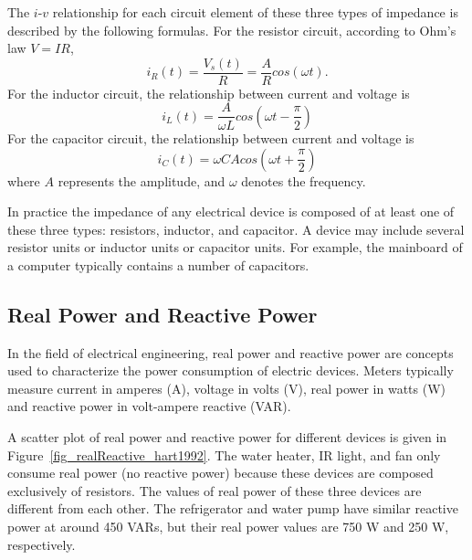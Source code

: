 The $i$-$v$ relationship for each circuit element of these
three types of impedance is described by the following formulas.
For the resistor circuit, according to Ohm's law $V=I R$,
\begin{equation}
i_R(t)=\frac{V_s(t)}{R}=\frac{A}{R}cos(\omega t).
\end{equation}
For the inductor circuit, the relationship between current and voltage is
\begin{equation}
i_L(t)=\frac{A}{\omega L}cos(\omega t- \frac {\pi}{2})
\end{equation}
For the capacitor circuit, the relationship between current and voltage is
\begin{equation}
i_C(t)= \omega CAcos(\omega t + \frac {\pi}{2})
\end{equation}
where $A$ represents the amplitude, 
and $\omega$ denotes the frequency.

In practice the impedance of any electrical device is composed of
at least one of these three types: 
resistors, inductor, and capacitor.
A device may include several resistor units or
inductor units or capacitor units.
For example, the mainboard of a computer 
typically contains a number of capacitors.

\subsection{Real Power and Reactive Power}
\label{sec_pvCalculation}
In the field of electrical engineering,
real power and reactive power are concepts used
to characterize the power consumption of electric devices.
Meters typically measure current in amperes (A),
voltage in volts (V),
real power in watts (W) and
reactive power in volt-ampere reactive (VAR).

A scatter plot of real power and reactive power for different devices
is given in 
Figure~\ref{fig_realReactive_hart1992}.
The water heater, IR light, and fan only consume
real power (no reactive power) because
these devices are composed exclusively of resistors.
The values of real power of these three devices
are different from each other.
The refrigerator and water pump have similar reactive
power at around 450 VARs, but their
real power values are 750 W and 250 W, respectively.


